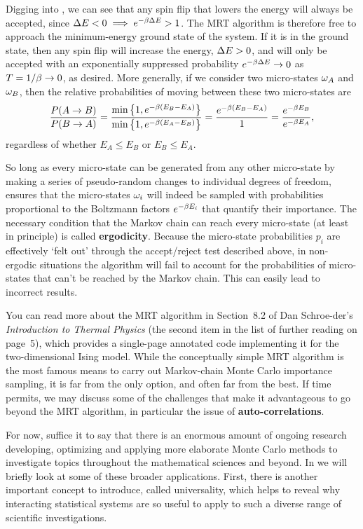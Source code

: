 Digging into , we can see that any spin flip that lowers the energy will always be accepted, since $\Delta E < 0 \implies e^{-\beta \Delta E} > 1$.
The MRT algorithm is therefore free to approach the minimum-energy ground state of the system.
If it is in the ground state, then any spin flip will increase the energy, $\Delta E > 0$, and will only be accepted with an exponentially suppressed probability $e^{-\beta \Delta E} \to 0$ as $T = 1 / \beta \to 0$, as desired.
More generally, if we consider two micro-states $\omega_A$ and $\omega_B$, then the relative probabilities of moving between these two micro-states are
\begin{equation}
  \label{eq:MRTdistribution}
  \frac{P(A \to B)}{P(B \to A)} = \frac{\mbox{min}\left\{1, e^{-\beta(E_B - E_A)}\right\}}{\mbox{min}\left\{1, e^{-\beta(E_A - E_B)}\right\}} = \frac{e^{-\beta(E_B - E_A)}}{1} = \frac{e^{-\beta E_B}}{e^{-\beta E_A}},
\end{equation}
regardless of whether $E_A \leq E_B$ or $E_B \leq E_A$.

So long as every micro-state can be generated from any other micro-state by making a series of pseudo-random changes to individual degrees of freedom,  ensures that the micro-states $\omega_i$ will indeed be sampled with probabilities proportional to the Boltzmann factors $e^{-\beta E_i}$ that quantify their importance.
The necessary condition that the Markov chain can reach every micro-state (at least in principle) is called \textbf{ergodicity}.
Because the micro-state probabilities $p_i$ are effectively `felt out' through the accept/reject test described above, in non-ergodic situations the algorithm will fail to account for the probabilities of micro-states that can't be reached by the Markov chain.
This can easily lead to incorrect results.

You can read more about the MRT algorithm in Section~8.2 of Dan Schroe-der's \textit{Introduction to Thermal Physics} (the second item in the list of further reading on page~5), which provides a single-page annotated code implementing it for the two-dimensional Ising model. %
While the conceptually simple MRT algorithm is the most famous means to carry out Markov-chain Monte Carlo importance sampling, it is far from the only option, and often far from the best.
If time permits, we may discuss some of the challenges that make it advantageous to go beyond the MRT algorithm, in particular the issue of \textbf{auto-correlations}.

For now, suffice it to say that there is an enormous amount of ongoing research developing, optimizing and applying more elaborate Monte Carlo methods to investigate topics throughout the mathematical sciences and beyond.
In  we will briefly look at some of these broader applications.
First, there is another important concept to introduce, called universality, which helps to reveal why interacting statistical systems are so useful to apply to such a diverse range of scientific investigations.



